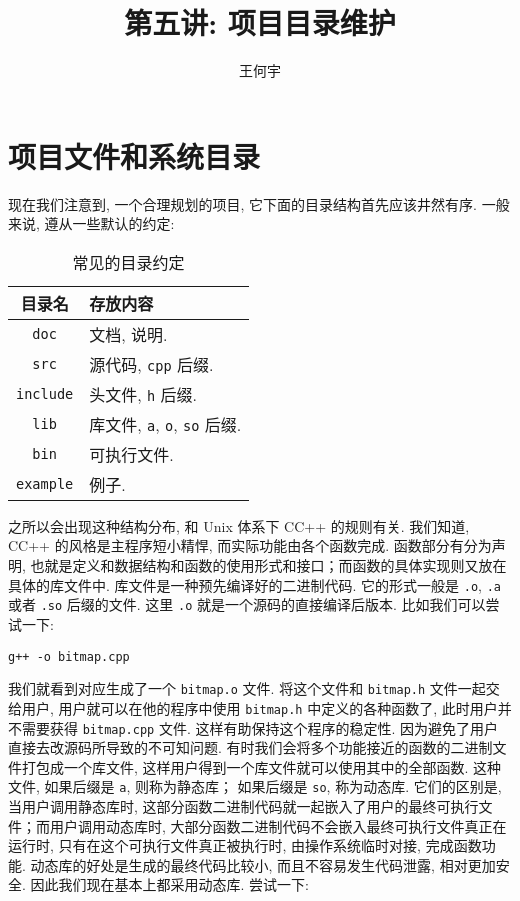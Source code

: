 \documentclass[a4paper]{ctexart}
\title{第五讲: 项目目录维护}
\author{王何宇}
\date{}
\begin{document}
\maketitle
\pagestyle{empty}

\section{项目文件和系统目录}
现在我们注意到, 一个合理规划的项目, 它下面的目录结构首先应该井然有序. 一般来说, 遵从一些默认的约定:

\begin{table}[!phb]
  \centering
  \begin{tabular}{|c|l|}
    \hline
    \bf{目录名} & \bf{存放内容} \\
    \hline
    \verb|doc| & 文档, 说明. \\
    \hline
    \verb|src| & 源代码, \verb|cpp| 后缀. \\
    \hline
    \verb|include| & 头文件, \verb|h| 后缀. \\
    \hline
    \verb|lib| & 库文件, \verb|a|, \verb|o|, \verb|so| 后缀. \\
    \hline
    \verb|bin| & 可执行文件. \\
    \hline
    \verb|example| & 例子. \\
    \hline
  \end{tabular}
  \caption{常见的目录约定}
  \label{tab::dir}
\end{table}

之所以会出现这种结构分布, 和 Unix 体系下 C\/C++ 的规则有关. 我们知道,
C\/C++ 的风格是主程序短小精悍, 而实际功能由各个函数完成. 函数部分有分为声明,
也就是定义和数据结构和函数的使用形式和接口；而函数的具体实现则又放在具体的库文件中.
库文件是一种预先编译好的二进制代码. 它的形式一般是 \verb|.o|, \verb|.a| 或者
\verb|.so| 后缀的文件. 这里 \verb|.o| 就是一个源码的直接编译后版本. 比如我们可以尝试一下:
\begin{verbatim}
g++ -o bitmap.cpp
\end{verbatim}
我们就看到对应生成了一个 \verb|bitmap.o| 文件. 将这个文件和 \verb|bitmap.h| 文件一起交给用户,
用户就可以在他的程序中使用 \verb|bitmap.h| 中定义的各种函数了, 此时用户并不需要获得
\verb|bitmap.cpp| 文件. 这样有助保持这个程序的稳定性.
因为避免了用户直接去改源码所导致的不可知问题. 有时我们会将多个功能接近的函数的二进制文件打包成一个库文件,
这样用户得到一个库文件就可以使用其中的全部函数. 这种文件, 如果后缀是 \verb|a|, 则称为静态库；
如果后缀是 \verb|so|, 称为动态库. 它们的区别是, 当用户调用静态库时,
这部分函数二进制代码就一起嵌入了用户的最终可执行文件；而用户调用动态库时,
大部分函数二进制代码不会嵌入最终可执行文件真正在运行时, 只有在这个可执行文件真正被执行时, 由操作系统临时对接,
完成函数功能. 动态库的好处是生成的最终代码比较小, 而且不容易发生代码泄露, 相对更加安全.
因此我们现在基本上都采用动态库. 尝试一下:
\end{document}
